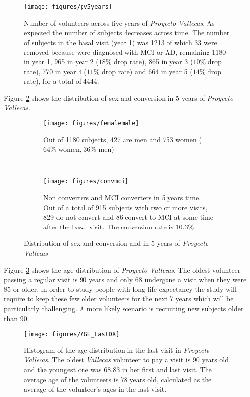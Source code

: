 \documentclass[11pt]{article}
\theoremstyle{definition}
\theoremstyle{remark}
\begin{document}
\begin{figure}[H]
        \centering
        \texttt{[image: figures/pv5years]}
        \caption{Number of volunteers across five years of \emph{Proyecto Vallecas}. As expected the number of subjects decreases across time. The number of subjects in the basal visit (year 1) was 1213 of which 33 were removed because were diagnosed with MCI or AD, remaining 1180 in year 1, 965 in year 2 ($18\%$ drop rate), 865 in year 3 ($10\%$ drop rate), 770 in year 4 ($11\%$ drop rate) and 664 in year 5 ($14\%$ drop rate), for a total of 4444.} \label{fig:pv5years}
\end{figure}

Figure \ref{fig:sexmci} shows the distribution of sex and conversion in 5 years of \emph{Proyecto Vallecas}.
\begin{figure}[H] 
    \centering
    \begin{subfigure}[t]{0.49\textwidth}
        \centering
        \texttt{[image: figures/femalemale]}
        \caption{Out of 1180 subjects, 427 are men and 753 women ($64\%$ women, $36\%$ men)}
    \end{subfigure}
    ~ 
    \begin{subfigure}[t]{0.49\textwidth}
        \centering
        \texttt{[image: figures/convmci]}
        \caption{Non converters and MCI converters in 5 years time. Out of a total of 915 subjects with two or more visits, 829 do not convert and 86 convert to MCI at some time after the basal visit. The conversion rate is $10.3\%$}
    \end{subfigure}%
    \caption{Distribution of sex and conversion and in 5 years of \emph{Proyecto Vallecas}} \label{fig:sexmci}
\end{figure}

Figure \ref{fig:age_dx} shows the age distribution of \emph{Proyecto Vallecas}. The oldest volunteer passing a regular visit is 90 years and only 68 undergone a visit when they were 85 or older. 
In order to study people with long life expectancy the study will require to keep these few older volunteers for the next 7 years which will be particularly challenging. A more likely scenario is recruiting new subjects older than 90.

\begin{figure}[H] 
        \centering
        \texttt{[image: figures/AGE\_LastDX]}
        \caption{Histogram of the age distribution in the last visit in \emph{Proyecto Vallecas}. The oldest \emph{Vallecas} volunteer to pay  a visit is 90 years old and the youngest one was 68.83 in her first and last visit. The average age of the volunteers is 78 years old, calculated as the average of the volunteer's ages in the last visit.} \label{fig:age_dx}
\end{figure}
\end{document}
